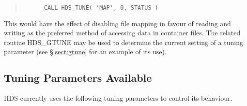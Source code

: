 \documentclass[11pt]{article}
\newcommand{\htmlref}[2]{#1}
\newcommand{\xlabel}[1]{}
\begin{document}
\begin{description}
\small
\begin{quote}
\begin{verbatim}
      CALL HDS_TUNE( 'MAP', 0, STATUS )
\end{verbatim}
\end{quote}
\normalsize

This would have the effect of disabling file mapping in favour of
reading and writing as the preferred method of accessing data in
container files. The related routine \htmlref{HDS\_GTUNE}{HDS_GTUNE}
may be used to determine the current setting of a tuning parameter
(see \S\ref{sect:gtune} for an example of its use).

\end{description}

\subsection{\xlabel{tuning_parameters_available}\label{sect:tuning_parameters}Tuning Parameters Available}

HDS currently uses the following tuning parameters to control its
behaviour.
\end{document}
